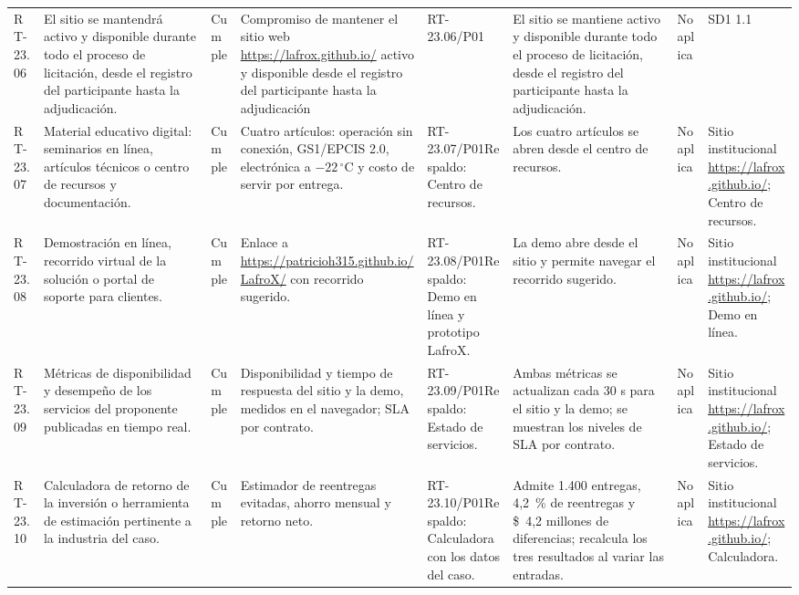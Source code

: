 \documentclass[oficio,firma,final]{lafrox}
\begin{document}
\begin{landscape}
{\begin{longtable}{@{}F{0.054} F{0.173} F{0.061} F{0.191} F{0.106} F{0.180} F{0.067} F{0.168}@{}}
  RT-23.06 & El sitio se mantendrá activo y disponible durante todo el proceso de licitación, desde el registro del participante hasta la adjudicación. & Cumple & Compromiso de mantener el sitio web \url{https://lafrox.github.io/} activo y disponible desde el registro del participante hasta la adjudicación & RT-23.06/\allowbreak{}P01 & El sitio se mantiene activo y disponible durante todo el proceso de licitación, desde el registro del participante hasta la adjudicación. & No aplica & SD1 1.1  \\
  RT-23.07 & Material educativo digital: seminarios en línea, artículos técnicos o centro de recursos y documentación. & Cumple & Cuatro artículos: operación sin conexión, GS1/EPCIS 2.0, electrónica a $-22\,^\circ\mathrm{C}$ y costo de servir por entrega. & RT-23.07/\allowbreak{}P01\newline Respaldo: Centro de recursos. & Los cuatro artículos se abren desde el centro de recursos. & No aplica & Sitio institucional \url{https://lafrox.github.io/}; Centro de recursos.  \\
  RT-23.08 & Demostración en línea, recorrido virtual de la solución o portal de soporte para clientes. & Cumple & Enlace a \url{https://patricioh315.github.io/LafroX/} con recorrido sugerido. & RT-23.08/\allowbreak{}P01\newline Respaldo: Demo en línea y prototipo LafroX. & La demo abre desde el sitio y permite navegar el recorrido sugerido. & No aplica & Sitio institucional \url{https://lafrox.github.io/}; Demo en línea.  \\
  RT-23.09 & Métricas de disponibilidad y desempeño de los servicios del proponente publicadas en tiempo real. & Cumple & Disponibilidad y tiempo de respuesta del sitio y la demo, medidos en el navegador; SLA por contrato. & RT-23.09/\allowbreak{}P01\newline Respaldo: Estado de servicios. & Ambas métricas se actualizan cada 30 s para el sitio y la demo; se muestran los niveles de SLA por contrato. & No aplica & Sitio institucional \url{https://lafrox.github.io/}; Estado de servicios.  \\
  RT-23.10 & Calculadora de retorno de la inversión o herramienta de estimación pertinente a la industria del caso. & Cumple & Estimador de reentregas evitadas, ahorro mensual y retorno neto. & RT-23.10/\allowbreak{}P01\newline Respaldo: Calculadora con los datos del caso. & Admite 1.400 entregas, 4,2~\% de reentregas y \$~4,2 millones de diferencias; recalcula los tres resultados al variar las entradas. & No aplica & Sitio institucional \url{https://lafrox.github.io/}; Calculadora.  \\

\end{longtable}}
\end{landscape}
\end{document}
